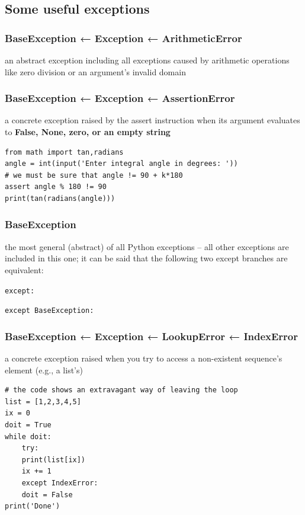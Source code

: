 \documentclass[11pt]{article}
\begin{document}
\subsection{Some useful exceptions}
\label{sec:orgbe78b43}
\subsubsection{BaseException ← Exception ← ArithmeticError}
\label{sec:org16f855a}
an abstract exception including all exceptions caused by arithmetic
operations like zero division or an argument’s invalid domain

\subsubsection{BaseException ← Exception ← AssertionError}
\label{sec:org0905e35}
a concrete exception raised by the assert instruction when its
argument evaluates to \textbf{False, None, zero, or an empty string}

\begin{verbatim}
from math import tan,radians
angle = int(input('Enter integral angle in degrees: '))
# we must be sure that angle != 90 + k*180
assert angle % 180 != 90
print(tan(radians(angle)))
\end{verbatim}

\subsubsection{BaseException}
\label{sec:orgbebdaf3}
the most general (abstract) of all Python exceptions – all other
exceptions are included in this one; it can be said that the following
two except branches are equivalent:

\texttt{except:}

\texttt{except BaseException:}

\subsubsection{BaseException ← Exception ← LookupError ← IndexError}
\label{sec:orgd65eb90}
a concrete exception raised when you try to access a non-existent
sequence’s element (e.g., a list’s)

\begin{verbatim}
# the code shows an extravagant way of leaving the loop
list = [1,2,3,4,5]
ix = 0
doit = True
while doit:
    try:
	print(list[ix])
	ix += 1
    except IndexError:
	doit = False
print('Done')
\end{verbatim}
\end{document}
